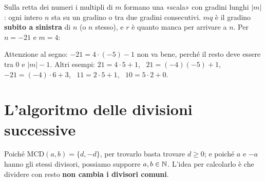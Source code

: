 \begin{spiegazione}
    Sulla retta dei numeri i multipli di $m$ formano una «scala» con gradini lunghi $|m|$: ogni intero $n$ sta su un gradino o tra due
    gradini consecutivi. $mq$ è il gradino \textbf{subito a sinistra} di $n$ (o $n$ stesso), e $r$ è quanto manca per arrivare a $n$.
    Per $n = -21$ e $m = 4$:
    \begin{center}
    \end{center}
    Attenzione al segno: $-21 = 4 \cdot (-5) - 1$ non va bene, perché il resto deve essere tra $0$ e $|m| - 1$. Altri esempi:
    $21 = 4 \cdot 5 + 1$, \ $21 = (-4)(-5) + 1$, \ $-21 = (-4) \cdot 6 + 3$, \ $11 = 2 \cdot 5 + 1$, \ $10 = 5 \cdot 2 + 0$.
\end{spiegazione}

\section{L'algoritmo delle divisioni successive}\label{sec:euclide}

Poiché $\mathrm{MCD}(a, b) = \{d, -d\}$, per trovarlo basta trovare $d \geq 0$; e poiché $a$ e $-a$ hanno gli stessi divisori, possiamo
supporre $a, b \in \mathbb{N}$. L'idea per calcolarlo è che dividere con resto \textbf{non cambia i divisori comuni}.

